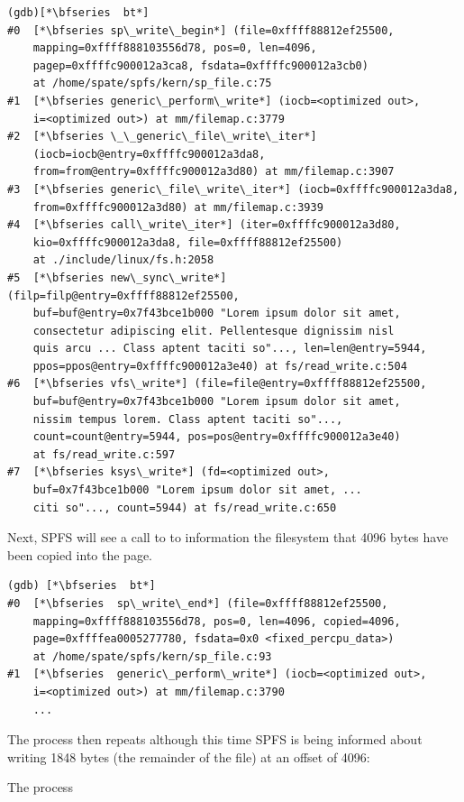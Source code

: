 \begin{lstlisting}
(gdb)[*\bfseries  bt*]
#0  [*\bfseries sp\_write\_begin*] (file=0xffff88812ef25500, 
    mapping=0xffff888103556d78, pos=0, len=4096, 
    pagep=0xffffc900012a3ca8, fsdata=0xffffc900012a3cb0) 
    at /home/spate/spfs/kern/sp_file.c:75
#1  [*\bfseries generic\_perform\_write*] (iocb=<optimized out>, 
    i=<optimized out>) at mm/filemap.c:3779
#2  [*\bfseries \_\_generic\_file\_write\_iter*] 
    (iocb=iocb@entry=0xffffc900012a3da8, 
    from=from@entry=0xffffc900012a3d80) at mm/filemap.c:3907
#3  [*\bfseries generic\_file\_write\_iter*] (iocb=0xffffc900012a3da8, 
    from=0xffffc900012a3d80) at mm/filemap.c:3939
#4  [*\bfseries call\_write\_iter*] (iter=0xffffc900012a3d80, 
    kio=0xffffc900012a3da8, file=0xffff88812ef25500) 
    at ./include/linux/fs.h:2058
#5  [*\bfseries new\_sync\_write*] (filp=filp@entry=0xffff88812ef25500, 
    buf=buf@entry=0x7f43bce1b000 "Lorem ipsum dolor sit amet, 
    consectetur adipiscing elit. Pellentesque dignissim nisl 
    quis arcu ... Class aptent taciti so"..., len=len@entry=5944, 
    ppos=ppos@entry=0xffffc900012a3e40) at fs/read_write.c:504
#6  [*\bfseries vfs\_write*] (file=file@entry=0xffff88812ef25500, 
    buf=buf@entry=0x7f43bce1b000 "Lorem ipsum dolor sit amet, 
    nissim tempus lorem. Class aptent taciti so"..., 
    count=count@entry=5944, pos=pos@entry=0xffffc900012a3e40) 
    at fs/read_write.c:597
#7  [*\bfseries ksys\_write*] (fd=<optimized out>, 
    buf=0x7f43bce1b000 "Lorem ipsum dolor sit amet, ... 
    citi so"..., count=5944) at fs/read_write.c:650
\end{lstlisting}

\noindent
Next, SPFS will see a call to  to information the filesystem that 4096 bytes have been copied into the page.

\begin{lstlisting}
(gdb) [*\bfseries  bt*]
#0  [*\bfseries  sp\_write\_end*] (file=0xffff88812ef25500, 
    mapping=0xffff888103556d78, pos=0, len=4096, copied=4096, 
    page=0xffffea0005277780, fsdata=0x0 <fixed_percpu_data>) 
    at /home/spate/spfs/kern/sp_file.c:93
#1  [*\bfseries  generic\_perform\_write*] (iocb=<optimized out>, 
    i=<optimized out>) at mm/filemap.c:3790
    ...
\end{lstlisting}

\noindent
The process then repeats although this time SPFS is being informed about writing 1848 bytes (the remainder of the file) at an offset of 4096:

\noindent
The process

